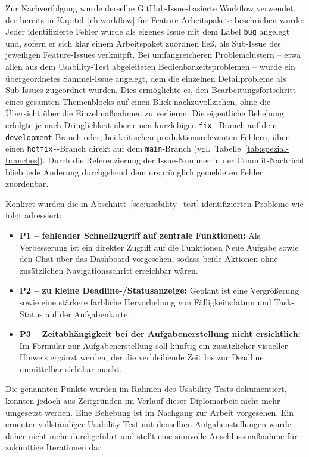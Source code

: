 Zur Nachverfolgung wurde derselbe GitHub-Issue-basierte Workflow verwendet, der bereits in Kapitel~\ref{ch:workflow} für Feature-Arbeitspakete beschrieben wurde: Jeder identifizierte Fehler wurde als eigenes Issue mit dem Label \texttt{bug} angelegt und, sofern er sich klar einem Arbeitspaket zuordnen ließ, als Sub-Issue des jeweiligen Feature-Issues verknüpft. Bei umfangreicheren Problemclustern -- etwa allen aus dem Usability-Test abgeleiteten Bedienbarkeitsproblemen -- wurde ein übergeordnetes Sammel-Issue angelegt, dem die einzelnen Detailprobleme als Sub-Issues zugeordnet wurden. Dies ermöglichte es, den Bearbeitungsfortschritt eines gesamten Themenblocks auf einen Blick nachzuvollziehen, ohne die Übersicht über die Einzelmaßnahmen zu verlieren. Die eigentliche Behebung erfolgte je nach Dringlichkeit über einen kurzlebigen \texttt{fix-}-Branch auf dem \texttt{development}-Branch oder, bei kritischen produktionsrelevanten Fehlern, über einen \texttt{hotfix-}-Branch direkt auf dem \texttt{main}-Branch (vgl.\ Tabelle~\ref{tab:spezial-branches}). Durch die Referenzierung der Issue-Nummer in der Commit-Nachricht blieb jede Änderung durchgehend dem ursprünglich gemeldeten Fehler zuordenbar.

Konkret wurden die in Abschnitt~\ref{sec:usability_test} identifizierten Probleme wie folgt adressiert:

\begin{itemize}
    \item \textbf{P1 -- fehlender Schnellzugriff auf zentrale Funktionen:} Als Verbesserung ist ein direkter Zugriff auf die Funktionen \glqq{}Neue Aufgabe\grqq{} sowie den Chat über das Dashboard vorgesehen, sodass beide Aktionen ohne zusätzlichen Navigationsschritt erreichbar wären.
    \item \textbf{P2 -- zu kleine Deadline-/Statusanzeige:} Geplant ist eine Vergrößerung sowie eine stärkere farbliche Hervorhebung von Fälligkeitsdatum und Task-Status auf der Aufgabenkarte.
    \item \textbf{P3 -- Zeitabhängigkeit bei der Aufgabenerstellung nicht ersichtlich:} Im Formular zur Aufgabenerstellung soll künftig ein zusätzlicher visueller Hinweis ergänzt werden, der die verbleibende Zeit bis zur Deadline unmittelbar sichtbar macht.
\end{itemize}
Die genannten Punkte wurden im Rahmen des Usability-Tests dokumentiert, konnten jedoch aus Zeitgründen im Verlauf dieser Diplomarbeit nicht mehr umgesetzt werden. Eine Behebung ist im Nachgang zur Arbeit vorgesehen. Ein erneuter vollständiger Usability-Test mit denselben Aufgabenstellungen wurde daher nicht mehr durchgeführt und stellt eine sinnvolle Anschlussmaßnahme für zukünftige Iterationen dar.